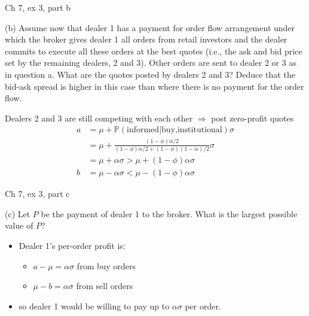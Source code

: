 \documentclass[english,10pt
,aspectratio=169
]{beamer}
\begin{document}
\begin{frame}{Ch 7, ex 3, part b}
	\begin{exampleblock}{}
		(b) Assume now that dealer 1 has a payment for order flow
		arrangement under which the broker gives dealer 1 all orders from retail
		investors and the dealer commits to execute all these orders at the best
		quotes (i.e., the ask and bid price set by the remaining dealers, 2 and 3).
		Other orders are sent to dealer 2 or 3 as in question a. What are the quotes
		posted by dealers 2 and 3? Deduce that the bid-ask spread is higher in this
		case than where there is no payment for the order flow.
	\end{exampleblock}
	
	\pause
	
	Dealers 2 and 3 are still competing with each other $\Rightarrow$ post zero-profit quotes
	\begin{align*}
		a &= \mu + \mathbb{P}(\text{informed}|\text{buy,institutional}) \sigma
		\\
		&= \mu + \frac{(1-\phi)\alpha/2}{(1-\phi)\alpha/2 + (1-\phi)(1-\alpha)/2} \sigma
		\\
		&= \mu + \alpha \sigma > \mu + (1-\phi)\alpha \sigma
		\\
		b &= \mu - \alpha \sigma < \mu - (1-\phi)\alpha \sigma
	\end{align*}
\end{frame}


\begin{frame}{Ch 7, ex 3, part c}
	\begin{exampleblock}{}
		(c) Let $P$ be the payment of dealer 1 to the broker. What is the
		largest possible value of $P$?
	\end{exampleblock}
	
	\pause
	
	\begin{itemize}
		\item Dealer 1's per-order profit is:
		\begin{itemize}
			\item $a - \mu = \alpha \sigma$ from buy orders
			\item $\mu - b = \alpha \sigma$ from sell orders
		\end{itemize}
		\item so dealer 1 would be willing to pay up to $\alpha \sigma$ per order.
	\end{itemize}
\end{frame}
\end{document}

